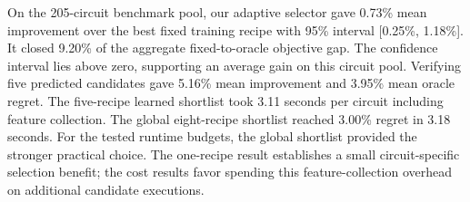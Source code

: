 On the 205-circuit benchmark pool, our adaptive selector gave 0.73\% mean improvement over the best fixed training recipe with 95\% interval [0.25\%, 1.18\%]. It closed 9.20\% of the aggregate fixed-to-oracle objective gap. The confidence interval lies above zero, supporting an average gain on this circuit pool. Verifying five predicted candidates gave 5.16\% mean improvement and 3.95\% mean oracle regret. The five-recipe learned shortlist took 3.11 seconds per circuit including feature collection. The global eight-recipe shortlist reached 3.00\% regret in 3.18 seconds. For the tested runtime budgets, the global shortlist provided the stronger practical choice. The one-recipe result establishes a small circuit-specific selection benefit; the cost results favor spending this feature-collection overhead on additional candidate executions.
